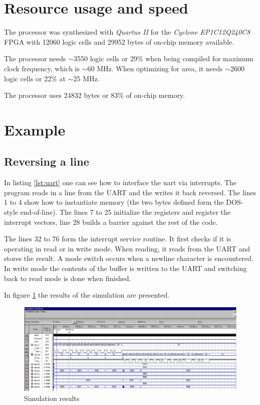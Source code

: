 \documentclass[10pt, twoside, a4paper]{article}
\begin{document}
  \section{Resource usage and speed}

  The processor was synthesized with \textsl{Quartus II} for the
  \textsl{Cyclone EP1C12Q240C8} FPGA with 12060 logic cells and 29952
  bytes of on-chip memory available.

  The processor needs $\sim$3550 logic cells or 29\% when being
  compiled for maximum clock frequency, which is $\sim$60 MHz. When
  optimizing for area, it needs $\sim$2600 logic cells or 22\% at
  $\sim$25 MHz.

  The processor uses 24832 bytes or 83\% of on-chip memory.

  \section{Example}

  \subsection{Reversing a line}

  In listing \ref{lst:uart} one can see how to interface the uart via
  interrupts. The program reads in a line from the UART and the writes
  it back reversed. The lines 1 to 4 show how to instantiate memory
  (the two bytes defined form the DOS-style end-of-line). The
  lines 7 to 25 initialize the registers and register the interrupt
  vectors, line 28 builds a barrier against the rest of the code.

  The lines 32 to 76 form the interrupt service routine. It first
  checks if it is operating in read or in write mode. When reading, it
  reads from the UART and stores the result. A mode switch occurs when
  a newline character is encountered. In write mode the contents of
  the buffer is written to the UART and switching back to read mode is
  done when finished.

  In figure \ref{fig:sim} the results of the simulation are presented.

  \lstset{basicstyle=\footnotesize,numbers=left,numberstyle=\tiny}
  \lstset{caption=Example for the UART and interrupts}
  \lstset{label=lst:uart}
  

  \begin{figure}[ht!]
    \centering
    \includegraphics[width=.95\textwidth]{uart_sim}
    \caption{Simulation results}
    \label{fig:sim}    
  \end{figure}
\end{document}
